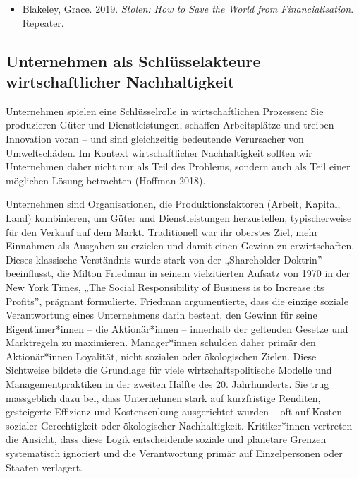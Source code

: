 \documentclass[
  nswissgerman,
  a4paper,
  DIV=11,
  numbers=noendperiod,
  oneside,
  openany]{scrreprt}
\providecommand{\tightlist}{%
  \setlength{\itemsep}{0pt}\setlength{\parskip}{0pt}}
\begin{document}
\begin{tcolorbox}[enhanced jigsaw, arc=.35mm, bottomrule=.15mm, bottomtitle=1mm, breakable, colback=white, colbacktitle=quarto-callout-caution-color!10!white, colframe=quarto-callout-caution-color-frame, coltitle=black, left=2mm, leftrule=.75mm, opacityback=0, opacitybacktitle=0.6, rightrule=.15mm, title={Weiterführende Literatur}, titlerule=0mm, toprule=.15mm, toptitle=1mm]

\begin{itemize}
\tightlist
\item
  Blakeley, Grace. 2019. \emph{Stolen: How to Save the World from
  Financialisation}. Repeater.
\end{itemize}

\end{tcolorbox}

\subsection{Unternehmen als Schlüsselakteure wirtschaftlicher
Nachhaltigkeit}\label{unternehmen-als-schluxfcsselakteure-wirtschaftlicher-nachhaltigkeit}

Unternehmen spielen eine Schlüsselrolle in wirtschaftlichen Prozessen:
Sie produzieren Güter und Dienstleistungen, schaffen Arbeitsplätze und
treiben Innovation voran -- und sind gleichzeitig bedeutende Verursacher
von Umweltschäden. Im Kontext wirtschaftlicher Nachhaltigkeit sollten
wir Unternehmen daher nicht nur als Teil des Problems, sondern auch als
Teil einer möglichen Lösung betrachten (Hoffman 2018).

Unternehmen sind Organisationen, die Produktionsfaktoren (Arbeit,
Kapital, Land) kombinieren, um Güter und Dienstleistungen herzustellen,
typischerweise für den Verkauf auf dem Markt. Traditionell war ihr
oberstes Ziel, mehr Einnahmen als Ausgaben zu erzielen und damit einen
Gewinn zu erwirtschaften. Dieses klassische Verständnis wurde stark von
der „Shareholder-Doktrin'' beeinflusst, die Milton Friedman in seinem
vielzitierten Aufsatz von 1970 in der New York Times, „The Social
Responsibility of Business is to Increase its Profits'', prägnant
formulierte. Friedman argumentierte, dass die einzige soziale
Verantwortung eines Unternehmens darin besteht, den Gewinn für seine
Eigentümer*innen -- die Aktionär*innen -- innerhalb der geltenden
Gesetze und Marktregeln zu maximieren. Manager*innen schulden daher
primär den Aktionär*innen Loyalität, nicht sozialen oder ökologischen
Zielen. Diese Sichtweise bildete die Grundlage für viele
wirtschaftspolitische Modelle und Managementpraktiken in der zweiten
Hälfte des 20. Jahrhunderts. Sie trug massgeblich dazu bei, dass
Unternehmen stark auf kurzfristige Renditen, gesteigerte Effizienz und
Kostensenkung ausgerichtet wurden -- oft auf Kosten sozialer
Gerechtigkeit oder ökologischer Nachhaltigkeit. Kritiker*innen vertreten
die Ansicht, dass diese Logik entscheidende soziale und planetare
Grenzen systematisch ignoriert und die Verantwortung primär auf
Einzelpersonen oder Staaten verlagert.
\end{document}
